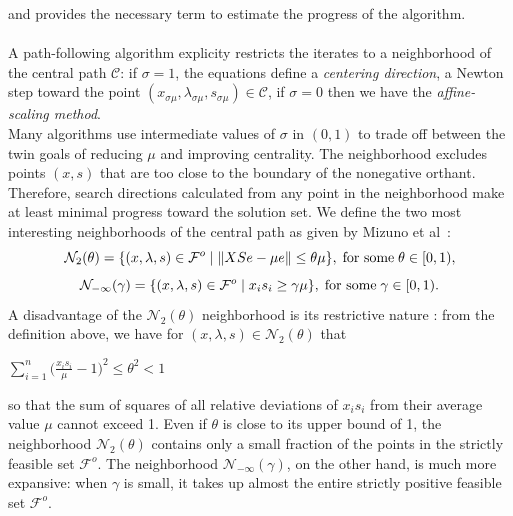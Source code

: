 \documentclass[a4paper,10 pt,titlepage,twoside]{book}
\theoremstyle{plain}
\theoremstyle{definition}
\theoremstyle{remark}
\begin{document}
 and provides the necessary term to estimate the progress of the
 algorithm.\\  
 \\
 A path-following algorithm explicity restricts the iterates to a neighborhood of the central path $\mathcal{C}$: if $\sigma = 1$, the equations define a \textit{centering direction}, a Newton step toward the point $(x_{\sigma\mu},\lambda_{\sigma\mu}, s_{\sigma\mu})\in\mathcal{C}$, if $\sigma = 0$ then we have the \textit{affine-scaling method}.\\  
 Many algorithms use intermediate values of $\sigma$ in $(0,1)$ to trade off between the twin goals of reducing $\mu$ and improving centrality. The neighborhood excludes points $(x, s) $ that are too close to the boundary of the nonegative orthant. Therefore, search directions calculated from any point in the neighborhood make at least minimal progress toward the solution set.
 We define the two most interesting neighborhoods of the central path as given
by Mizuno et al~\cite{5}:\\
\begin{equation*}
\mathcal{N}_{2}(\theta) =\{(x, \lambda,s)\in\mathcal{F}^{o} \;|\;\lVert XSe - \mu e \rVert \leq \theta \mu \}, \text{\;for some\;} \theta \in [0,1),
\end{equation*} 
\begin{equation*}
\mathcal{N}_{-\infty}(\gamma) =\{ (x, \lambda,s)\in\mathcal{F}^{o} \;|\; x_{i}s_{i} \geq \gamma \mu \}, \text{\;for some\;} \gamma \in [0,1).
\end{equation*} 
A disadvantage of the $\mathcal{N}_{2}(\theta)$ neighborhood is its restrictive nature \cite{W}: from the definition above, we have for $(x, \lambda,s)\in\mathcal{N}_{2}(\theta)$ that
\begin{center}
	$\sum\limits_{i=1}^{n}\big(\frac{x_{i}s_{i}}{\mu}-1\big)^{2}\leq \theta^{2}<1$
\end{center} 
so that the sum of squares of all relative deviations of $x_{i}s_{i}$ from their average value $\mu$ cannot exceed 1. Even if $\theta$ is close to its upper bound of 1, the neighborhood $\mathcal{N}_{2}(\theta)$ contains only a small fraction of the points in the strictly feasible set $\mathcal{F}^{o}$. The neighborhood $\mathcal{N}_{-\infty}(\gamma)$, on the other hand, is much more expansive: when $\gamma$ is small, it takes up almost the entire strictly positive feasible set $\mathcal{F}^{o}$. 
\newpage
\end{document}
